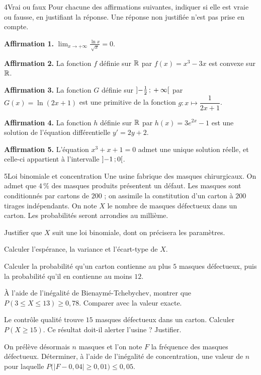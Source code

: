 

\begin{exoBac}{4}{Vrai ou faux}
Pour chacune des affirmations suivantes, indiquer si elle est vraie ou fausse, en justifiant la réponse. Une réponse non justifiée
n'est pas prise en compte.
\begin{questions}
  \item \textbf{Affirmation 1.} $\displaystyle\lim_{x\to+\infty}\frac{\ln x}{\sqrt x}=0$.
  \item \textbf{Affirmation 2.} La fonction $f$ définie sur $\mathbb{R}$ par $f(x)=x^{3}-3x$ est convexe sur $\mathbb{R}$.
  \item \textbf{Affirmation 3.} La fonction $G$ définie sur $\mathopen{]}-\frac12\,{;}\,+\infty\mathclose{[}$ par $G(x)=\ln(2x+1)$ est une primitive de la
    fonction $g:x\mapsto\dfrac{1}{2x+1}$.
  \item \textbf{Affirmation 4.} La fonction $h$ définie sur $\mathbb{R}$ par $h(x)=3e^{2x}-1$ est une solution de l'équation différentielle
    $y'=2y+2$.
  \item \textbf{Affirmation 5.} L'équation $x^{3}+x+1=0$ admet une unique solution réelle, et celle-ci appartient à l'intervalle
    $\mathopen{]}-1\,{;}\,0\mathclose{[}$.
\end{questions}
\end{exoBac}

\begin{exoBac}{5}{Loi binomiale et concentration}
Une usine fabrique des masques chirurgicaux. On admet que $4\,\%$ des masques produits présentent un défaut. Les masques sont conditionnés
par cartons de $200$ ; on assimile la constitution d'un carton à $200$ tirages indépendants. On note $X$ le nombre de masques
défectueux dans un carton. Les probabilités seront arrondies au millième.
\begin{questions}
  \item Justifier que $X$ suit une loi binomiale, dont on précisera les paramètres.
  \item Calculer l'espérance, la variance et l'écart-type de $X$.
  \item Calculer la probabilité qu'un carton contienne au plus $5$ masques défectueux, puis la probabilité qu'il en contienne au
    moins $12$.
  \item À l'aide de l'inégalité de Bienaymé-Tchebychev, montrer que $P(3\leq X\leq13)\geq0{,}78$. Comparer avec la valeur exacte.
  \item Le contrôle qualité trouve $15$ masques défectueux dans un carton. Calculer $P(X\geq15)$. Ce résultat doit-il alerter
    l'usine ? Justifier.
  \item On prélève désormais $n$ masques et l'on note $F$ la fréquence des masques défectueux. Déterminer, à l'aide de l'inégalité de
    concentration, une valeur de $n$ pour laquelle $P\big(|F-0{,}04|\geq0{,}01\big)\leq0{,}05$.
\end{questions}
\end{exoBac}

